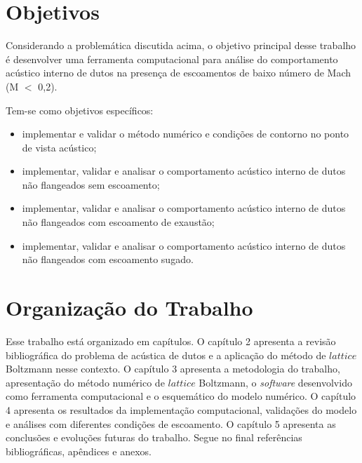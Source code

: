 \section{Objetivos}

Considerando a problemática discutida acima, o objetivo principal desse trabalho é desenvolver uma ferramenta computacional para análise do comportamento acústico interno de dutos na presença de escoamentos de baixo número de Mach (M $<$ 0,2).

Tem-se como objetivos específicos:
\begin{itemize}
    \item implementar e validar o método numérico e condições de contorno no ponto de vista acústico;
    \item implementar, validar e analisar o comportamento acústico interno de dutos não flangeados sem escoamento;
    \item implementar, validar e analisar o comportamento acústico interno de dutos não flangeados com escoamento de exaustão;
    \item implementar, validar e analisar o comportamento acústico interno de dutos não flangeados com escoamento sugado.
\end{itemize}

\section{Organização do Trabalho}

Esse trabalho está organizado em capítulos. O capítulo 2 apresenta a revisão bibliográfica do problema de acústica de dutos e a aplicação do método de $lattice$ Boltzmann nesse contexto. O capítulo 3 apresenta a metodologia do trabalho, apresentação do método numérico de $lattice$ Boltzmann, o \textit{software} desenvolvido como ferramenta computacional e o esquemático do modelo numérico. O capítulo 4 apresenta os resultados da implementação computacional, validações do modelo e análises com diferentes condições de escoamento. O capítulo 5 apresenta as conclusões e evoluções futuras do trabalho. Segue no final referências bibliográficas, apêndices e anexos.